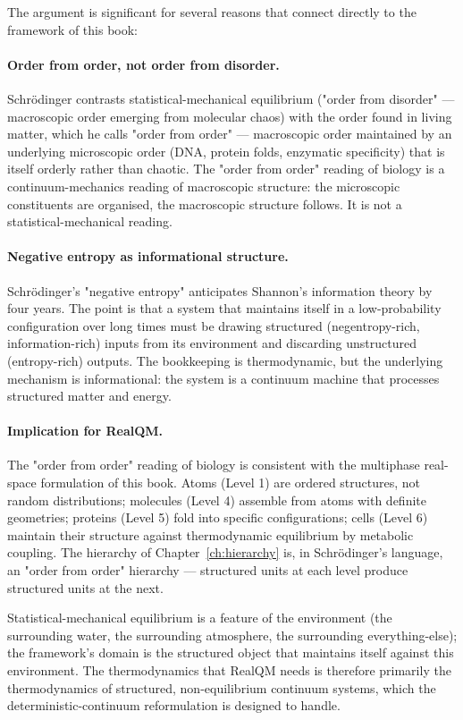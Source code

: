 The argument is significant for several reasons that connect directly to the framework of this book:

\paragraph{Order from order, not order from disorder.}
Schr\"odinger contrasts statistical-mechanical equilibrium ("order from disorder" --- macroscopic order emerging from molecular chaos) with the order found in living matter, which he calls "order from order" --- macroscopic order maintained by an underlying microscopic order (DNA, protein folds, enzymatic specificity) that is itself orderly rather than chaotic. The "order from order" reading of biology is a continuum-mechanics reading of macroscopic structure: the microscopic constituents are organised, the macroscopic structure follows. It is not a statistical-mechanical reading.

\paragraph{Negative entropy as informational structure.}
Schr\"odinger's "negative entropy" anticipates Shannon's information theory by four years. The point is that a system that maintains itself in a low-probability configuration over long times must be drawing structured (negentropy-rich, information-rich) inputs from its environment and discarding unstructured (entropy-rich) outputs. The bookkeeping is thermodynamic, but the underlying mechanism is informational: the system is a continuum machine that processes structured matter and energy.

\paragraph{Implication for RealQM.}
The "order from order" reading of biology is consistent with the multiphase real-space formulation of this book. Atoms (Level 1) are ordered structures, not random distributions; molecules (Level 4) assemble from atoms with definite geometries; proteins (Level 5) fold into specific configurations; cells (Level 6) maintain their structure against thermodynamic equilibrium by metabolic coupling. The hierarchy of Chapter~\ref{ch:hierarchy} is, in Schr\"odinger's language, an "order from order" hierarchy --- structured units at each level produce structured units at the next.

Statistical-mechanical equilibrium is a feature of the environment (the surrounding water, the surrounding atmosphere, the surrounding everything-else); the framework's domain is the structured object that maintains itself against this environment. The thermodynamics that RealQM needs is therefore primarily the thermodynamics of structured, non-equilibrium continuum systems, which the deterministic-continuum reformulation is designed to handle.

